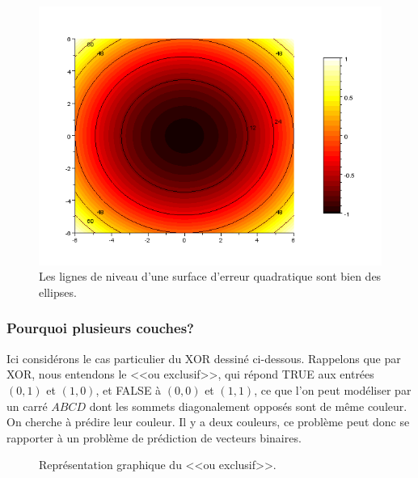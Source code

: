 \documentclass{article}
\theoremstyle{definition}
\begin{document}
\begin{figure}[!h]\centering
\includegraphics[scale=0.5]{level.png}
\caption{Les lignes de niveau d'une surface d'erreur quadratique sont bien des ellipses. }
\label{fig:level}
\end{figure}

\newpage


\subsubsection{Pourquoi plusieurs couches?}

\noindent Ici considérons le cas particulier du XOR dessiné ci-dessous. Rappelons que par XOR, nous entendons le <<ou exclusif>>, qui répond TRUE aux entrées $(0,1)$ et $(1,0)$, et FALSE à $(0,0)$ et $(1,1)$, ce que l'on peut modéliser par un carré $ABCD$ dont les sommets diagonalement opposés sont de même couleur. On cherche à prédire leur couleur. Il y a deux couleurs, ce problème peut donc se rapporter à un problème de prédiction de vecteurs binaires.

\begin{figure}[h!]
\begin{center}
\end{center}
\label{XOR}
\caption{Représentation graphique du <<ou exclusif>>.}
\end{figure}
\end{document}
